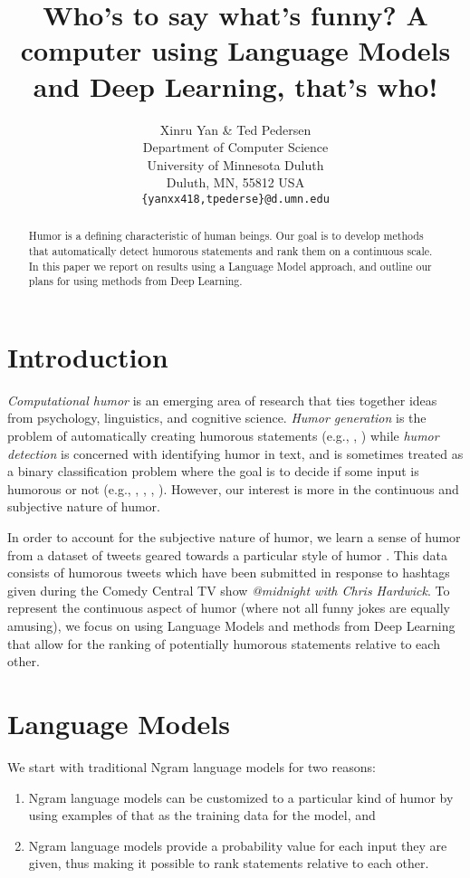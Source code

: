 \documentclass[11pt,a4paper]{article}
\title{Who's to say what's funny? A computer using Language Models and Deep Learning, that's who!}
\author{Xinru Yan \& Ted Pedersen\\
  Department of Computer Science \\ University of Minnesota Duluth \\ Duluth, MN, 55812 USA \\
  {\tt \{yanxx418,tpederse\}@d.umn.edu}}
\date{}
\begin{document}
\maketitle
\begin{abstract}
Humor is a defining characteristic of human beings. 
Our goal is to develop methods that automatically 
detect humorous statements and rank them on a 
continuous scale. In this paper we report on  results 
using a Language Model approach, and outline our
plans for using methods from Deep Learning.
\end{abstract}

\section{Introduction}
\textit{Computational humor} is an emerging area of 
research that ties together ideas from psychology, 
linguistics, and cognitive science. 
\textit{Humor generation} is the problem of automatically
creating humorous statements 
(e.g., \cite{StockS03}, \cite{ozbal2012computational})
while \textit{humor detection} is concerned with identifying
humor in text, and is sometimes treated as 
a binary classification problem where the goal is to
decide if some input is humorous or not 
(e.g., \cite{Learning:To:Laugh}, 
\cite{Recognizing:Humor:On:Twitter}, \cite{ShahafHM15},
\cite{MillerG15}). However, our interest is more in 
the continuous and subjective nature of humor. 

In order to account for the subjective nature of humor,
we learn a sense of humor from a dataset of tweets geared
towards a particular style of humor \cite{2016hashtagwars}. 
This data consists of humorous tweets which have been
submitted in response to hashtags given during the Comedy
Central TV show \textit{@midnight with Chris Hardwick}.
To represent the continuous aspect of humor (where not all
funny jokes are equally amusing), we focus on using Language
Models and methods from Deep Learning that allow for the
ranking of potentially humorous statements relative to 
each other. 

\section{Language Models}

We start with traditional Ngram language models for two reasons: 
\begin{enumerate}
\item Ngram language models can be customized to a particular kind of 
humor by using examples of that as the training data for the model, and
\item Ngram language models provide a probability value for each
input they are given, thus making it possible to rank statements
relative to each other.  
\end{enumerate}
\end{document}
